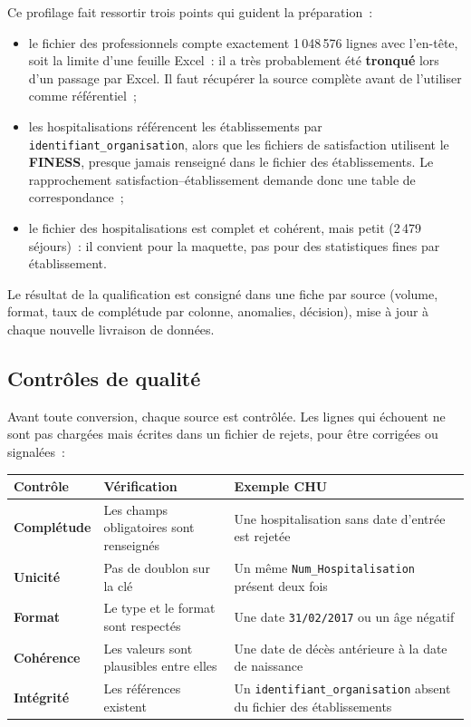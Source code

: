 \noindent Ce profilage fait ressortir trois points qui guident la préparation~:
\begin{itemize}
	\item le fichier des professionnels compte exactement 1\,048\,576 lignes avec l'en-tête, soit la limite d'une feuille Excel~: il a très probablement été \textbf{tronqué} lors d'un passage par Excel. Il faut récupérer la source complète avant de l'utiliser comme référentiel~;
	\item les hospitalisations référencent les établissements par \texttt{identifiant\_\allowbreak organisation}, alors que les fichiers de satisfaction utilisent le \textbf{FINESS}, presque jamais renseigné dans le fichier des établissements. Le rapprochement satisfaction--établissement demande donc une table de correspondance~;
	\item le fichier des hospitalisations est complet et cohérent, mais petit (2\,479 séjours)~: il convient pour la maquette, pas pour des statistiques fines par établissement.
\end{itemize}

\noindent Le résultat de la qualification est consigné dans une fiche par source (volume, format, taux de complétude par colonne, anomalies, décision), mise à jour à chaque nouvelle livraison de données.

\subsection{Contrôles de qualité}

\noindent Avant toute conversion, chaque source est contrôlée. Les lignes qui échouent ne sont pas chargées mais écrites dans un fichier de rejets, pour être corrigées ou signalées~:

\begin{center}
\begin{tabularx}{\textwidth}{>{\bfseries}l >{\raggedright\arraybackslash}X >{\raggedright\arraybackslash}X}
\toprule
Contrôle & Vérification & Exemple CHU \\
\midrule
Complétude & Les champs obligatoires sont renseignés & Une hospitalisation sans date d'entrée est rejetée \\
Unicité & Pas de doublon sur la clé & Un même \texttt{Num\_\allowbreak Hospitalisation} présent deux fois \\
Format & Le type et le format sont respectés & Une date \texttt{31/02/2017} ou un âge négatif \\
Cohérence & Les valeurs sont plausibles entre elles & Une date de décès antérieure à la date de naissance \\
Intégrité & Les références existent & Un \texttt{identifiant\_\allowbreak organisation} absent du fichier des établissements \\
\bottomrule
\end{tabularx}
\end{center}

